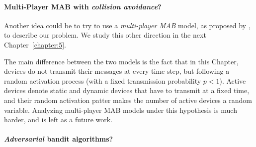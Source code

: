 \paragraph{Multi-Player MAB with \emph{collision avoidance}?}

Another idea could be to try to use a \emph{multi-player MAB} model, as proposed by \cite{Zhao10}, to describe our problem.
We study this other direction in the next Chapter~\ref{chapter:5}.

The main difference between the two models is the fact that in this Chapter, devices do not transmit their messages at every time step, but following a random activation process (with a fixed transmission probability $p < 1$).
Active devices denote static and dynamic devices that have to transmit at a fixed time,
and their random activation patter makes the number of active devices a random variable.
Analyzing multi-player MAB models under this hypothesis is much harder, and is left as a future work.



\paragraph{\emph{Adversarial} bandit algorithms?}

